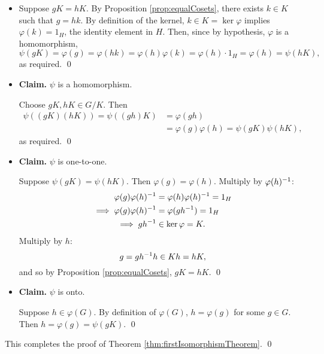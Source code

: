 \documentclass[../algebraNotesMSRI-UP2016.tex]{subfiles}
\begin{document}
\begin{frame}
\begin{itemize}
\item[] Suppose $gK=hK$.  By Proposition \ref{prop:equalCosets}, there exists $k\in K$ such that $g=hk$.  By definition of the kernel, $k\in K=\ker{\varphi}$ implies $\varphi(k)=1_{H}$, the identity element in $H$.  Then, since by hypothesis, $\varphi$ is a homomorphism,
\[
\psi(gK)=\varphi(g)=\varphi(hk)=\varphi(h)\varphi(k)=\varphi(h)\cdot 1_{H}=\varphi(h)=\psi(hK),
\]
as required.
\qed

\smallGap
\item \textbf{Claim.} $\psi$ is a homomorphism.

\smallGap
\pf Choose $gK,hK\in G/K$.  Then
\begin{align*}
\psi{\left((gK)(hK)\right)} = \psi{\left((gh)K\right)} &= \varphi(gh) \\
	&= \varphi(g)\varphi(h)=\psi{(gK)}\psi{(hK)},	
\end{align*}
as required.
\qed
\end{itemize}
\end{frame}

\begin{frame}
\begin{itemize}  
\item \textbf{Claim.} $\psi$ is one-to-one.

\smallGap
\pf Suppose $\psi(gK)=\psi(hK)$.  Then $\varphi(g)=\varphi(h)$.  Multiply by $\varphi(h)^{-1}$:
\begin{align*}
\varphi(g)\varphi(h)^{-1} &= \varphi(h)\varphi(h)^{-1}=1_{H} \\
\implies \varphi(g)\varphi(h)^{-1} &= \varphi(gh^{-1})= 1_H \\
\implies gh^{-1} &\in\ker{\varphi}=K.
\end{align*}
Multiply by $h$:%
\[
g=gh^{-1}h\in Kh=hK,
\] 
and so by Proposition \ref{prop:equalCosets}, $gK=hK$.
\qed
\end{itemize}
\end{frame}

\begin{frame}
\begin{itemize}
\item \textbf{Claim.} $\psi$ is onto.

\smallGap
\pf Suppose $h\in\varphi(G)$.  By definition of $\varphi(G)$, $h=\varphi(g)$ for some $g\in G$.  Then $h=\varphi(g)=\psi(gK)$.
\qed
\end{itemize}
This completes the proof of Theorem \ref{thm:firstIsomorphismTheorem}.
\qed
\end{frame}
\end{document}
